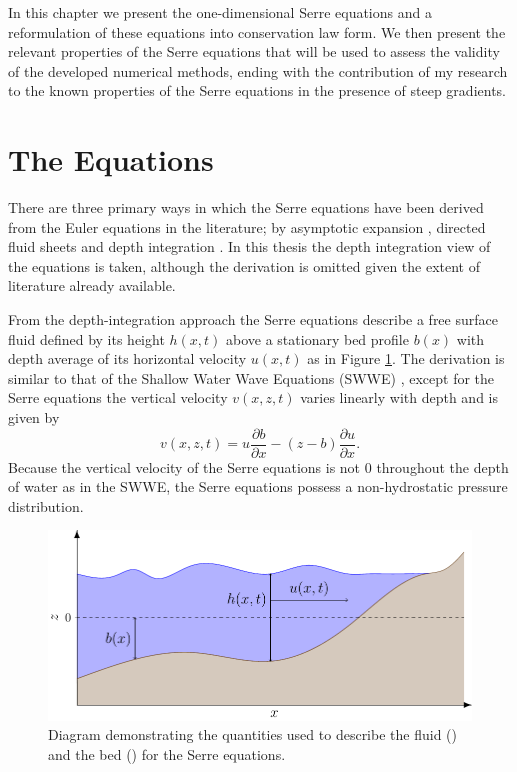 In this chapter we present the one-dimensional Serre equations and a reformulation of these equations into conservation law form. We then present the relevant properties of the Serre equations that will be used to assess the validity of the developed numerical methods, ending with the contribution of my research to the known properties of the Serre equations in the presence of steep gradients. 

\section{The Equations}
There are three primary ways in which the Serre equations have been derived from the Euler equations in the literature; by asymptotic expansion \cite{Serre-F-1953-857,Bonneton-Lannes-2009-16601}, directed fluid sheets \cite{Green-Naghdi-1976-237} and depth integration \cite{Su-Gardener-1969-536,Seabra-Santos-etal-1987-117}. In this thesis the depth integration view of the equations is taken, although the derivation is omitted given the extent of literature already available. 

From the depth-integration approach the Serre equations describe a free surface fluid defined by its height $h(x,t)$ above a stationary bed profile $b(x)$ with depth average of its horizontal velocity $u(x,t)$ as in Figure \ref{fig:WaterModel}. The derivation is similar to that of the Shallow Water Wave Equations (SWWE) \cite{Liggett-1994}, except for the Serre equations the vertical velocity $v(x,z,t)$ varies linearly with depth and is given by \cite{Zoppou-2014}
\begin{equation}
v(x,z,t) = u \frac{\partial b}{\partial x} - (z - b) \frac{\partial u}{\partial x}.
\label{eqn:VertVelSerre}
\end{equation}
Because the vertical velocity of the Serre equations is not $0$ throughout the depth of water as in the SWWE, the Serre equations possess a non-hydrostatic pressure distribution.

\begin{figure}
	\centering
	\includegraphics[width=\textwidth]{./chp2/figures/SerreModel.pdf}
	\caption{Diagram demonstrating the quantities used to describe the fluid () and the bed () for the Serre equations.}
	\label{fig:WaterModel}
\end{figure}

